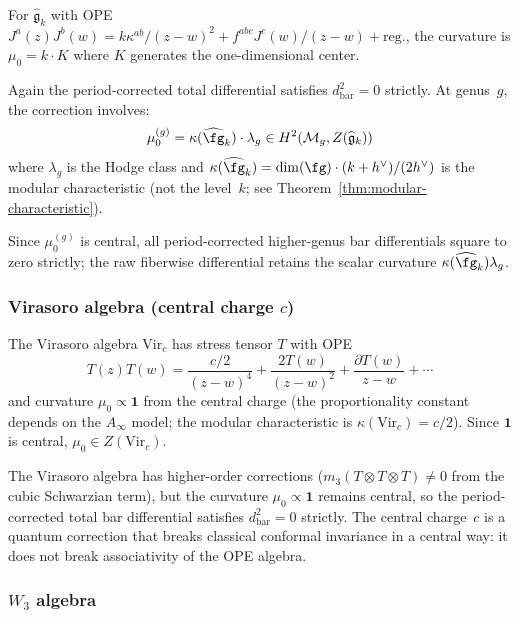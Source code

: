 \begin{example}\label{ex:kac-moody-strict}
For $\widehat{\mathfrak{g}}_k$ with OPE $J^a(z)J^b(w) = k\kappa^{ab}/(z-w)^2 + f^{abc}J^c(w)/(z-w) + \text{reg.}$, the curvature is $\mu_0 = k \cdot K$ where $K$ generates the one-dimensional center.

Again the period-corrected total differential satisfies
$d_{\text{bar}}^2 = 0$ strictly.
At genus~$g$, the correction involves:
\[\mu_0^{(g)} = \kappa(\widehat{\fg}_k) \cdot \lambda_g \in H^2(\mathcal{M}_g, Z(\widehat{\mathfrak{g}}_k))\]
where $\lambda_g$ is the Hodge class and $\kappa(\widehat{\fg}_k) = \dim(\fg) \cdot (k+h^\vee)/(2h^\vee)$ is the modular characteristic (not the level~$k$; see Theorem~\ref{thm:modular-characteristic}).

Since $\mu_0^{(g)}$ is central, all period-corrected higher-genus
bar differentials square to zero strictly; the raw fiberwise
differential retains the scalar curvature
$\kappa(\widehat{\fg}_k)\lambda_g$.
\end{example}

\subsubsection{\texorpdfstring{Virasoro algebra (central charge $c$)}{Virasoro algebra (central charge c)}}

\begin{example}\label{ex:virasoro-strict}
The Virasoro algebra $\text{Vir}_c$ has stress tensor $T$ with OPE
\[T(z)T(w) = \frac{c/2}{(z-w)^4} + \frac{2T(w)}{(z-w)^2} + \frac{\partial T(w)}{z-w} + \cdots\]
and curvature $\mu_0 \propto \mathbf{1}$ from the central charge (the proportionality constant depends on the $A_\infty$ model; the modular characteristic is $\kappa(\mathrm{Vir}_c) = c/2$). Since $\mathbf{1}$ is central, $\mu_0 \in Z(\mathrm{Vir}_c)$.

The Virasoro algebra has higher-order corrections
($m_3(T \otimes T \otimes T) \neq 0$ from the cubic Schwarzian
term), but the curvature $\mu_0 \propto \mathbf{1}$ remains central,
so the period-corrected total bar differential satisfies
$d_{\text{bar}}^2 = 0$ strictly. The central charge~$c$ is a
quantum correction that breaks classical conformal invariance in a
central way: it does not break associativity of the OPE algebra.
\end{example}

\subsubsection{\texorpdfstring{$W_3$ algebra}{W-3 algebra}}

